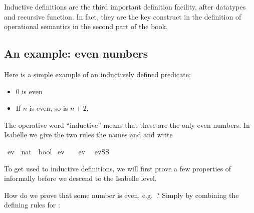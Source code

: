 \begin{isabellebody}
\begin{isamarkuptext}
Inductive definitions are the third important definition facility, after
datatypes and recursive function.
\sem
In fact, they are the key construct in the
definition of operational semantics in the second part of the book.
\endsem

\subsection{An example: even numbers}
\label{sec:Logic:even}

Here is a simple example of an inductively defined predicate:
\begin{itemize}
\item 0 is even
\item If $n$ is even, so is $n+2$.
\end{itemize}
The operative word ``inductive'' means that these are the only even numbers.
In Isabelle we give the two rules the names  and 
and write%
\end{isamarkuptext}%
\isamarkuptrue%
\isamarkupfalse%
\ ev\ {}{}\ {}nat\ {}\ bool{}\ \isanewline
ev{}{}\ \ \ \ {}ev\ {}{}\ {}\isanewline
evSS{}\ \ %
%
\begin{isamarkuptext}%
To get used to inductive definitions, we will first prove a few
properties of  informally before we descend to the Isabelle level.

How do we prove that some number is even, e.g.\ ? Simply by combining the defining rules for :
\begin{quote}
\end{quote}


\end{isamarkuptext}
\end{isabellebody}

